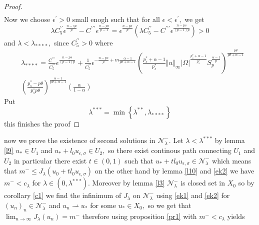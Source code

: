 \documentclass[10pt,twoside,reqno,centertags,draft]{amsart}
\begin{document}
\begin{proof}
\begin{equation*}
\begin{aligned}
\end{aligned}
\end{equation*}
Now we choose $ \epsilon^{\prime} >0$ small enogh such that for all $ \epsilon <\epsilon^{\prime},$ we get
\begin{equation*}
\lambda C^{\prime\prime}_{5}\epsilon^{\frac{n -sp}{p}} -C^{\prime\prime\prime}\epsilon^{\frac{n -ps}{p -1}} = \epsilon^{{\frac{n -ps}{p}}} 
\left( \lambda  C^{\prime\prime}_{5} -C^{\prime\prime\prime}\epsilon^{\frac{n -ps}{(p -1)p}}\right) >0
\end{equation*}
and $ \lambda < \lambda_{****},$  since $ C^{\prime\prime}_{5} >0$ where
{\tiny
\begin{equation*}
\begin{aligned}
&\lambda_{****} =\frac{C^{\prime\prime\prime}}{ C^{\prime\prime}_{5}} \epsilon^{\frac{n -ps}{(p -1)p}} +\frac{1}{ C^{\prime\prime}_{5}}\epsilon^{ -\frac{n -ps}{p } +m\frac{\alpha -1}{p\theta +\alpha -1}}\left(\frac{p_s^* +\alpha -1}{p_s^*}\Vert u\Vert_{\infty}\vert \Omega\vert^{\frac{p_s^* +\alpha -1}{p_s^*}}S_{p}^{\frac{\alpha -1}{p}}\right)^{\frac{p\theta}{p\theta +\alpha -1}}\\
&\left( \frac{p_s^* -p\theta}{p_s^*p\theta}\right)^{\frac{\alpha -1}{p\theta +\alpha -1}}\left( \frac{\alpha}{1 -\alpha}\right)
\end{aligned}
\end{equation*}
}
Put
\begin{equation*}
\lambda^{***} =\min\left\lbrace \lambda^{**}, \lambda_{****} \right\rbrace
\end{equation*}
this finishes the proof
\end{proof}
now we prove the existence of second solutions in $ \mathcal{N}_{\lambda}^{-}.$ Let $ \lambda < \lambda^{***}$ by lemma \ref{l9} $ u_* \in U_1$ and $ u_* +l_0u_{\epsilon,\sigma} \in U_2,$ so there exist continous path connecting $ U_1$ and $ U_2$ in particular there exist $ t \in (0, 1)$ such that 
$ u_* +tl_0u_{\epsilon,\sigma} \in \mathcal{N}_{\lambda}^{-}$ which means that
$ m^{-} \leq J_{\lambda}(u_0 +tl_0u_{\epsilon, \sigma})$ on the other hand by lemma \ref{l10} and \ref{ek2} we have $ m^{-} <c_{\lambda}$ for 
$ \lambda \in (0, \lambda^{***}).$ Moreover by lemma \ref{l3} $ \mathcal{N}_{\lambda}^{-}$ is closed set in $ X_0$ so by corollary \ref{c1} we find the infinimum of  $ J_{\lambda}$ on $\mathcal{N}_{\lambda}^{-}$ using \ref{ek1} and \ref{ek2} for $  (u_n)_n \in \mathcal{N}_{\lambda}^{-}$ and $ u_n \rightharpoonup u_*$ for some $ u_* \in X_0,$ so we get that $ \lim_{n \to \infty} J_{\lambda}(u_n) =m^- $ therefore using proposition \ref{pr1} with $ m^- <c_{\lambda}$ yields 
\end{document}

